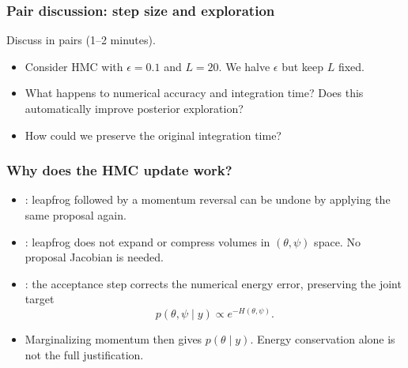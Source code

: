 \documentclass[10pt]{beamer}
\begin{document}
\begin{frame}
\frametitle{Pair discussion: step size and exploration}

Discuss in pairs (1--2 minutes).
\begin{itemize}
\item Consider HMC with $\epsilon=0.1$ and $L=20$.
  We halve $\epsilon$ but keep $L$ fixed.
\item What happens to numerical accuracy and integration time?
  Does this automatically improve posterior exploration?
\item How could we preserve the original integration time?
\end{itemize}

\end{frame}

\begin{frame}
\frametitle{Why does the HMC update work?}

\begin{itemize}
\item {}: leapfrog followed by a momentum reversal can
  be undone by applying the same proposal again.
\pause
\item {}: leapfrog does not expand or compress
  volumes in $(\theta,\psi)$ space. No proposal Jacobian is needed.
\pause
\item {}: the acceptance step corrects the
  numerical energy error, preserving the joint target
  \[
  p(\theta,\psi\mid y)\propto e^{-H(\theta,\psi)}.
  \]
\item Marginalizing momentum then gives $p(\theta\mid y)$.
  Energy conservation alone is not the full justification.
\end{itemize}
\end{frame}
\end{document}
